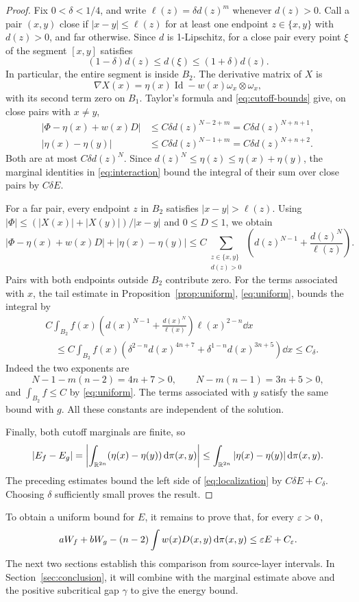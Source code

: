 \begin{proof}
Fix \(0<\delta<1/4\), and write \(\ell(z)=\delta d(z)^m\) whenever
\(d(z)>0\). Call a pair \((x,y)\) close if
\(|x-y|\le\ell(z)\) for at least one endpoint \(z\in\{x,y\}\)
with \(d(z)>0\), and far otherwise. Since \(d\) is 1-Lipschitz,
for a close pair every point \(\xi\) of the segment \([x,y]\) satisfies
\[
  (1-\delta)d(z)\le d(\xi)\le(1+\delta)d(z).
\]
In particular, the entire segment is inside \(B_2\).
The derivative matrix of \(X\) is
\[
  \nabla X(x)=\eta(x)\operatorname{Id}
                   -w(x)\omega_x\otimes\omega_x,
\]
with its second term zero on \(B_1\). Taylor's formula and
\eqref{eq:cutoff-bounds} give, on close pairs with \(x\ne y\),
\begin{align*}
  |\Phi-\eta(x)+w(x)D|
       &\le C\delta d(z)^{N-2+m}
        =C\delta d(z)^{N+n+1},\\
  |\eta(x)-\eta(y)|
       &\le C\delta d(z)^{N-1+m}
        =C\delta d(z)^{N+n+2}.
\end{align*}
Both are at most \(C\delta d(z)^N\). Since
\(d(z)^N\le\eta(z)\le\eta(x)+\eta(y)\), the marginal identities
in \eqref{eq:interaction} bound the integral of their sum over close
pairs by \(C\delta E\).

For a far pair, every endpoint \(z\) in \(B_2\) satisfies
\(|x-y|>\ell(z)\). Using
\(|\Phi|\le(|X(x)|+|X(y)|)/|x-y|\) and \(0\le D\le1\), we obtain
\[
  |\Phi-\eta(x)+w(x)D|+|\eta(x)-\eta(y)|
   \le C\sum_{\substack{z\in\{x,y\}\\d(z)>0}}
          \left(d(z)^{N-1}+\frac{d(z)^N}{\ell(z)}\right).
\]
Pairs with both endpoints outside \(B_2\) contribute zero.
For the terms associated with \(x\), the tail estimate in
Proposition~\ref{prop:uniform}, \eqref{eq:uniform}, bounds the integral
by
\[
\begin{split}
  &C\int_{B_2}f(x)
       \left(d(x)^{N-1}+\frac{d(x)^N}{\ell(x)}\right)
       \ell(x)^{2-n}\dd x\\
  &\quad\le C\int_{B_2}f(x)
      \left(\delta^{2-n}d(x)^{4n+7}
                 +\delta^{1-n}d(x)^{3n+5}\right)\dd x
       \le C_\delta.
\end{split}
\]
Indeed the two exponents are
\[
  N-1-m(n-2)=4n+7>0,\qquad
  N-m(n-1)=3n+5>0,
\]
and \(\int_{B_2}f\le C\) by \eqref{eq:uniform}.
The terms associated with \(y\) satisfy the same bound with \(g\).
All these constants are independent of the solution.

Finally, both cutoff marginals are finite, so
\[
  |E_f-E_g|
    =\left|\int_{\mathbb R^{2n}}(\eta(x)-\eta(y))\,\mathrm d\pi(x,y)\right|
    \le\int_{\mathbb R^{2n}}|\eta(x)-\eta(y)|\,\mathrm d\pi(x,y).
\]
The preceding estimates bound the left side of
\eqref{eq:localization} by \(C\delta E+C_\delta\).
Choosing \(\delta\) sufficiently small proves the result.
\end{proof}

To obtain a uniform bound for \(E\), it remains to prove that, for every
\(\varepsilon>0\),
\[
 aW_f+bW_g-(n-2)\int w(x)D(x,y)\,\mathrm d\pi(x,y)
 \le\varepsilon E+C_\varepsilon.
\]
The next two sections establish this comparison from source-layer
intervals. In Section~\ref{sec:conclusion}, it will combine with the
marginal estimate above and the positive subcritical gap \(\gamma\)
to give the energy bound.
